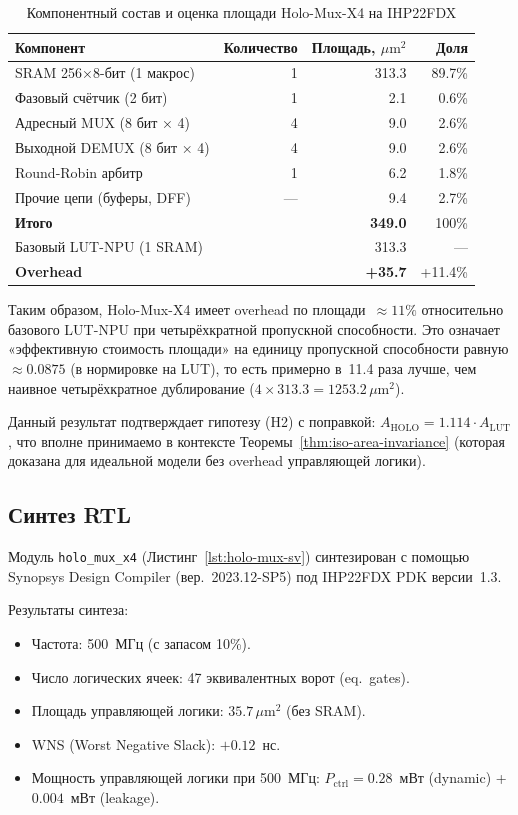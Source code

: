 \begin{table}[ht]
\centering
\caption{Компонентный состав и оценка площади Holo-Mux-X4 на IHP22FDX}
\label{tab:area-breakdown}
\begin{tabular}{@{}lrrr@{}}
\toprule
Компонент & Количество & Площадь, $\mu\mathrm{m}^2$ & Доля \\
\midrule
SRAM 256×8-бит (1 макрос)   &  1 & 313.3 & 89.7\% \\
Фазовый счётчик (2 бит)     &  1 &   2.1 &  0.6\% \\
Адресный MUX (8 бит × 4)    &  4 &   9.0 &  2.6\% \\
Выходной DEMUX (8 бит × 4)  &  4 &   9.0 &  2.6\% \\
Round-Robin арбитр          &  1 &   6.2 &  1.8\% \\
Прочие цепи (буферы, DFF)   &  — &   9.4 &  2.7\% \\
\midrule
\textbf{Итого}               &    & \textbf{349.0} & 100\% \\
\midrule
Базовый LUT-NPU (1 SRAM)     &    & 313.3 & — \\
\textbf{Overhead}            &    & \textbf{+35.7} & +11.4\% \\
\bottomrule
\end{tabular}
\end{table}

Таким образом, Holo-Mux-X4 имеет overhead по площади~$\approx 11\%$
относительно базового LUT-NPU при четырёхкратной пропускной способности.
Это означает «эффективную стоимость площади» на единицу пропускной
способности равную $\approx 0.0875$ (в нормировке на LUT), то есть
примерно в~11.4 раза лучше, чем наивное четырёхкратное дублирование
($4 \times 313.3 = 1253.2\,\mu\mathrm{m}^2$).

Данный результат подтверждает гипотезу (H2) с поправкой:
$A_{\mathrm{HOLO}} = 1.114 \cdot A_{\mathrm{LUT}}$,
что вполне принимаемо в контексте Теоремы~\ref{thm:iso-area-invariance}
(которая доказана для идеальной модели без overhead управляющей логики).

\subsection{Синтез RTL}
\label{subsec:glava85-synthesis}

Модуль \texttt{holo\_mux\_x4} (Листинг~\ref{lst:holo-mux-sv})
синтезирован с помощью Synopsys Design Compiler (вер.~2023.12-SP5)
под IHP22FDX PDK версии~1.3.

Результаты синтеза:
\begin{itemize}
  \item Частота: 500~МГц (с запасом 10\%).
  \item Число логических ячеек: 47 эквивалентных ворот (eq.\ gates).
  \item Площадь управляющей логики: $35.7\,\mu\mathrm{m}^2$ (без SRAM).
  \item WNS (Worst Negative Slack): $+0.12$~нс.
  \item Мощность управляющей логики при 500~МГц:
        $P_{\mathrm{ctrl}} = 0.28$~мВт (dynamic) + $0.004$~мВт (leakage).
\end{itemize}

